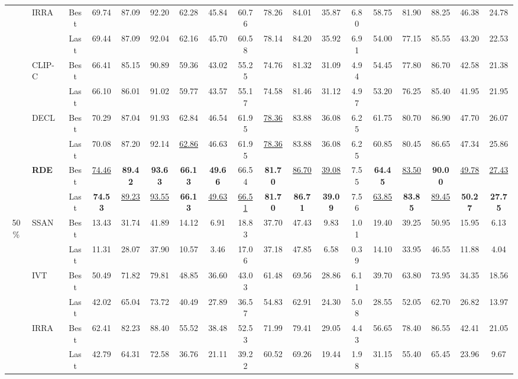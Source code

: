 \documentclass[10pt,twocolumn,letterpaper]{article}
\begin{document}
\begin{table}[t]
{\begin{tabular}{c|lc|ccccc|ccccc|ccccc}
        &\multirow{2}{*}{IRRA}&Best&69.74&87.09&92.20&62.28&45.84&60.76&78.26&84.01&35.87&6.80&
58.75&81.90&88.25&46.38&24.78 \\
    &&Last&69.44&87.09&92.04&62.16&45.70&60.58&78.14&84.20&35.92&6.91&54.00&77.15&85.55&43.20&22.53\\

        &\multirow{2}{*}{CLIP-C}&Best&66.41&85.15&90.89&59.36&43.02&55.25&74.76&81.32&31.09&4.94&54.45&77.80&86.70&42.58&21.38  \\
        &&Last&66.10&86.01&91.02&59.77&43.57&55.17&74.58&81.46&31.12&4.97&53.20&76.25&85.40&41.95&21.95\\

        &\multirow{2}{*}{DECL}&Best&70.29&87.04&91.93&62.84&46.54&61.95&\underline{78.36}&83.88&36.08&6.25&{61.75}&80.70&86.90&{47.70}&{26.07} \\
        &&Last&70.08&87.20&{92.14}&\underline{62.86}&46.63&61.95&\underline{78.36}&83.88&36.08&6.25&60.85&80.45&86.65&47.34&25.86 \\
        
          &\multirow{2}{*}{\textbf{RDE}}&Best& \underline{74.46}&\textbf{89.42} & \textbf{93.63} & \textbf{66.13} & \textbf{49.66} & 66.54 & \textbf{81.70} & \underline{86.70} & \underline{39.08} & {7.55}&\textbf{64.45} & \underline{83.50} & \textbf{90.00} & \underline{49.78} & \underline{27.43} \\
        &&Last&\textbf{74.53} & \underline{89.23} &\underline{93.55}& \textbf{66.13}& \underline{49.63} & \underline{66.51} & \textbf{81.70} & \textbf{86.71} & \textbf{39.09} & {7.56} &\underline{63.85}& \textbf{83.85}& \underline{89.45} & \textbf{50.27}& \textbf{27.75} \\\midrule

 
 
        \multirow{12}{*}{50\%}&\multirow{2}{*}{SSAN}&Best&13.43&31.74&41.89&14.12&6.91&18.83&37.70&47.43&9.83&1.01&19.40&39.25&50.95&15.95&6.13\\
        &&Last&11.31&28.07&37.90&10.57&3.46&17.06&37.18&47.85&6.58&0.39&14.10&33.95&46.55&11.88&4.04\\ 
        &\multirow{2}{*}{IVT}&Best&50.49&71.82&79.81&48.85&36.60&43.03&61.48&69.56&28.86&6.11&39.70&63.80&73.95&34.35&18.56 \\
        &&Last&42.02&65.04&73.72&40.49&27.89&36.57&54.83&62.91&24.30&5.08&28.55&52.05&62.70&26.82&13.97\\ 
        &\multirow{2}{*}{IRRA}&Best&62.41&82.23&88.40&55.52&38.48&52.53&71.99&79.41&29.05&4.43&56.65&78.40&86.55&42.41&21.05 \\
        &&Last&42.79&64.31&72.58&36.76&21.11&39.22&60.52&69.26&19.44&1.98&31.15&55.40&65.45&23.96&9.67 \\


\end{tabular}}
\end{table}
\end{document}
